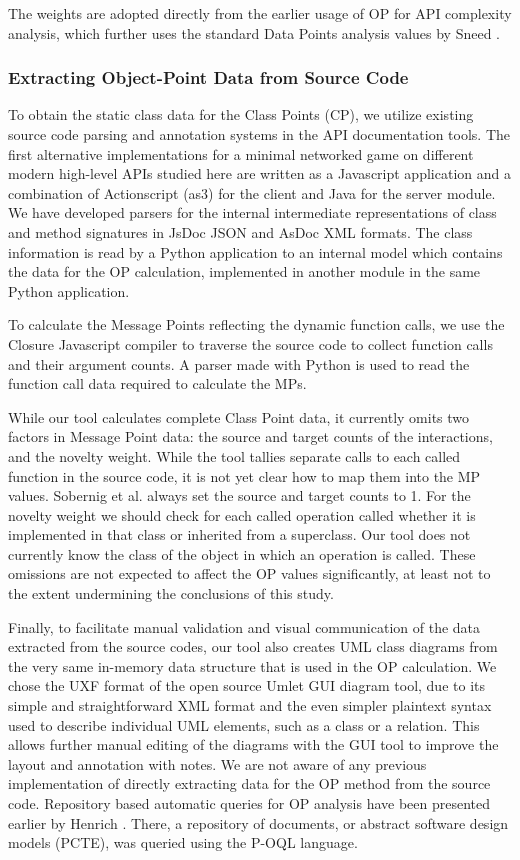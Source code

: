 \documentclass[conference]{IEEEtran}
\begin{document}
The weights are adopted directly from the earlier usage of OP for API
complexity analysis, which further uses the standard Data Points
analysis values by Sneed \cite{Sneed}.

\subsubsection{Extracting Object-Point Data from Source Code}

To obtain the static class data for the Class Points (CP), we utilize
existing source code parsing and annotation systems in the API
documentation tools. The first alternative implementations for a
minimal networked game on different modern high-level APIs studied
here are written as a Javascript application and a combination of
Actionscript (as3) for the client and Java for the server module. We
have developed parsers for the internal intermediate representations
of class and method signatures in JsDoc JSON and AsDoc XML
formats. The class information is read by a Python application to an
internal model which contains the data for the OP calculation,
implemented in another module in the same Python application.

To calculate the Message Points reflecting the dynamic function calls,
we use the Closure Javascript compiler to traverse the source code to
collect function calls and their argument counts. A parser made with
Python is used to read the function call data required to calculate
the MPs.

While our tool calculates complete Class Point data, it currently
omits two factors in Message Point data: the source and target counts
of the interactions, and the novelty weight. While the tool tallies
separate calls to each called function in the source code, it is not
yet clear how to map them into the MP values. Sobernig et al. always
set the source and target counts to 1. For the novelty weight we
should check for each called operation called whether it is
implemented in that class or inherited from a superclass. Our tool
does not currently know the class of the object in which an operation
is called. These omissions are not expected to affect the OP values
significantly, at least not to the extent undermining the conclusions
of this study.  

Finally, to facilitate manual validation and visual communication of
the data extracted from the source codes, our tool also creates UML
class diagrams from the very same in-memory data structure that is
used in the OP calculation. We chose the UXF format of the open source
Umlet GUI diagram tool, due to its simple and straightforward XML
format and the even simpler plaintext syntax used to describe
individual UML elements, such as a class or a relation. This allows
further manual editing of the diagrams with the GUI tool to improve
the layout and annotation with notes. We are not aware of any previous
implementation of directly extracting data for the OP method from the
source code. Repository based automatic queries for OP analysis have
been presented earlier by Henrich
\cite{henrich97repositorybased}. There, a repository of documents, or
abstract software design models (PCTE), was queried using the P-OQL
language.
\end{document}
